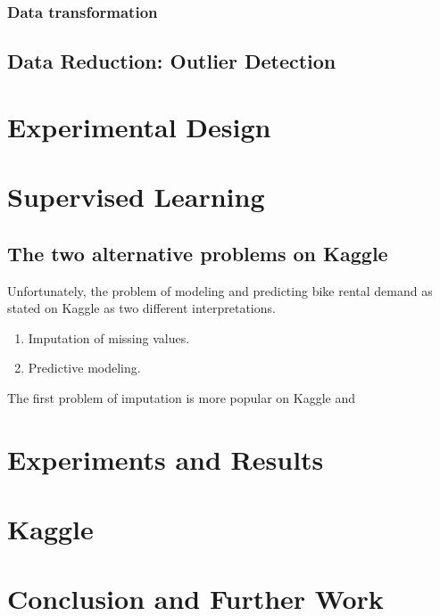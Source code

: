 \documentclass[12pt]{article}
\begin{document}
\subsubsection{Data transformation}

\subsection{Data Reduction: Outlier Detection}






\section{Experimental Design}
\label{sec:experimental-design}



\section{Supervised Learning}
\label{supervised learning}

\subsection{The two alternative problems on Kaggle}

Unfortunately, the problem of modeling and predicting bike rental demand as stated on Kaggle as two different interpretations.

\begin{enumerate}
	\item Imputation of missing values.
	\item Predictive modeling.
\end{enumerate}

The first problem of imputation is more popular on Kaggle and 

\section{Experiments and Results}
\label{sec:experiments-and-results}

\section{Kaggle}


\section{Conclusion and Further Work}
\label{sec:conclusion}
\end{document}
